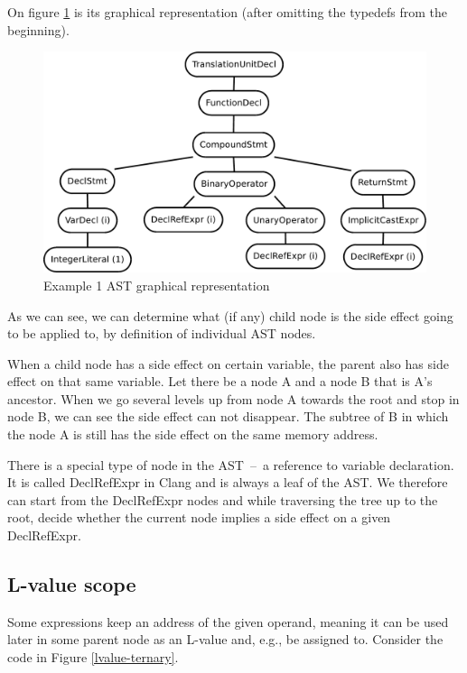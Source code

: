 On figure \ref{ASTuntagged} is its graphical representation (after omitting the typedefs from the beginning).
\begin{figure}
    \caption{Example 1 AST graphical representation}
    \label{ASTuntagged}
    \centering
        \includegraphics[width=1\textwidth]{fig/example1G.pdf}
\end{figure}

As we can see, we can determine what (if any) child node is the side effect going to be applied to, by definition of individual AST nodes. 

When a child node has a side effect on certain variable, the parent also has side effect on that same variable. Let there be a node A and a node B that is A's ancestor. When we go several levels up from node A towards the root and stop in node B, we can see the side effect can not disappear. The subtree of B in which the node A is still has the side effect on the same memory address.

There is a special type of node in the AST~--~a reference to variable declaration. It is called DeclRefExpr in Clang and is always a leaf of the AST. We therefore can start from the DeclRefExpr nodes and while traversing the tree up to the root, decide whether the current node implies a side effect on a given DeclRefExpr.

\subsection{L-value scope}
Some expressions keep an address of the given operand, meaning it can be used later in some parent node as an L-value and, e.g., be assigned to. Consider the code in Figure \ref{lvalue-ternary}.

